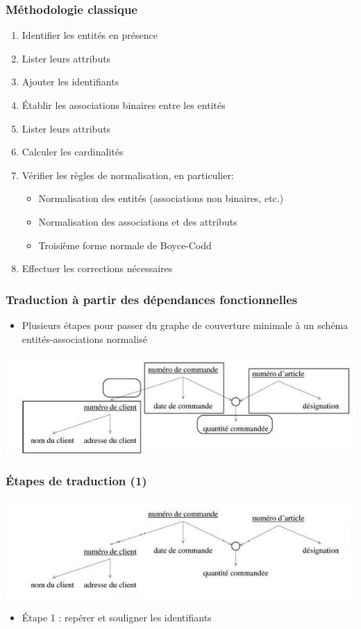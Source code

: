 \begin{frame}
  \frametitle{Méthodologie classique}
  \begin{enumerate}
    \item Identifier les entités en présence
    \item Lister leurs attributs
    \item Ajouter les identifiants
    \item Établir les associations binaires entre les entités
    \item Lister leurs attributs
    \item Calculer les cardinalités
    \item Vérifier les règles de normalisation, en particulier:
      \begin{itemize}
        \item Normalisation des entités (associations non binaires, etc.)
        \item Normalisation des associations et des attributs
        \item Troisième forme normale de Boyce-Codd
      \end{itemize}
    \item Effectuer les corrections nécessaires
  \end{enumerate}
\end{frame}

\begin{frame}
  \frametitle{Traduction à partir des dépendances fonctionnelles}
  \begin{itemize}
    \item Plusieurs étapes pour passer du graphe de couverture minimale à un schéma entités-associations normalisé
  \end{itemize}
  \begin{center}
    \includegraphics[width=0.9\linewidth]{graphe_identifie_5.jpg}
  \end{center}
\end{frame}

\begin{frame}
  \frametitle{Étapes de traduction (1)}
  \begin{center}
    \includegraphics[width=0.9\linewidth]{graphe_identifie_1.jpg}
  \end{center}
  \begin{itemize}
    \item Étape 1 : repérer et souligner les identifiants
  \end{itemize}
\end{frame}


